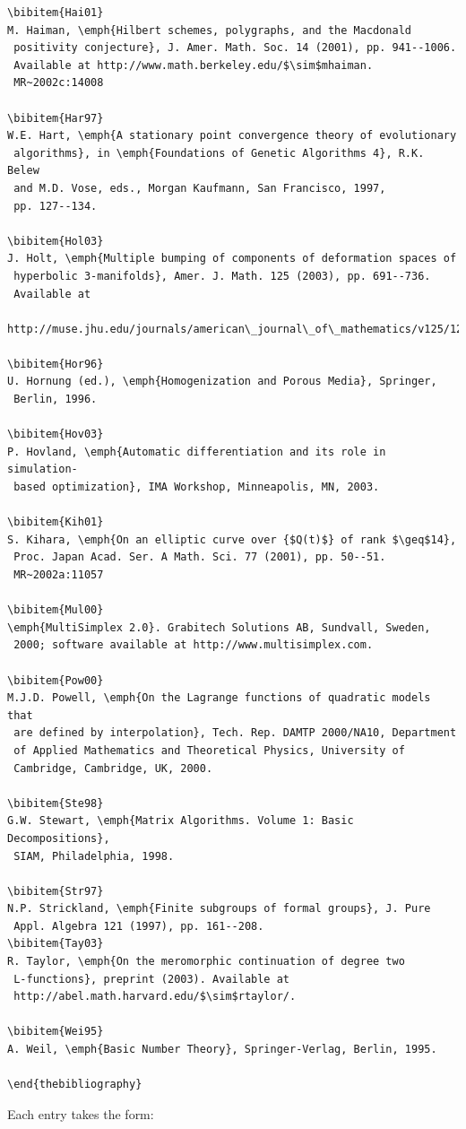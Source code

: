 \documentclass[]{interact}
\theoremstyle{plain}%
\theoremstyle{definition}
\theoremstyle{remark}
\begin{document}
\begin{verbatim}
\bibitem{Hai01}
M. Haiman, \emph{Hilbert schemes, polygraphs, and the Macdonald
 positivity conjecture}, J. Amer. Math. Soc. 14 (2001), pp. 941--1006.
 Available at http://www.math.berkeley.edu/$\sim$mhaiman.
 MR~2002c:14008

\bibitem{Har97}
W.E. Hart, \emph{A stationary point convergence theory of evolutionary
 algorithms}, in \emph{Foundations of Genetic Algorithms 4}, R.K. Belew
 and M.D. Vose, eds., Morgan Kaufmann, San Francisco, 1997,
 pp. 127--134.

\bibitem{Hol03}
J. Holt, \emph{Multiple bumping of components of deformation spaces of
 hyperbolic 3-manifolds}, Amer. J. Math. 125 (2003), pp. 691--736.
 Available at
 http://muse.jhu.edu/journals/american\_journal\_of\_mathematics/v125/125.4holt.pdf.

\bibitem{Hor96}
U. Hornung (ed.), \emph{Homogenization and Porous Media}, Springer,
 Berlin, 1996.

\bibitem{Hov03}
P. Hovland, \emph{Automatic differentiation and its role in simulation-
 based optimization}, IMA Workshop, Minneapolis, MN, 2003.

\bibitem{Kih01}
S. Kihara, \emph{On an elliptic curve over {$Q(t)$} of rank $\geq$14},
 Proc. Japan Acad. Ser. A Math. Sci. 77 (2001), pp. 50--51.
 MR~2002a:11057

\bibitem{Mul00}
\emph{MultiSimplex 2.0}. Grabitech Solutions AB, Sundvall, Sweden,
 2000; software available at http://www.multisimplex.com.

\bibitem{Pow00}
M.J.D. Powell, \emph{On the Lagrange functions of quadratic models that
 are defined by interpolation}, Tech. Rep. DAMTP 2000/NA10, Department
 of Applied Mathematics and Theoretical Physics, University of
 Cambridge, Cambridge, UK, 2000.

\bibitem{Ste98}
G.W. Stewart, \emph{Matrix Algorithms. Volume 1: Basic Decompositions},
 SIAM, Philadelphia, 1998.

\bibitem{Str97}
N.P. Strickland, \emph{Finite subgroups of formal groups}, J. Pure
 Appl. Algebra 121 (1997), pp. 161--208.
\bibitem{Tay03}
R. Taylor, \emph{On the meromorphic continuation of degree two
 L-functions}, preprint (2003). Available at
 http://abel.math.harvard.edu/$\sim$rtaylor/.

\bibitem{Wei95}
A. Weil, \emph{Basic Number Theory}, Springer-Verlag, Berlin, 1995.

\end{thebibliography}
\end{verbatim}
\bigskip
\noindent Each entry takes the form:
\end{document}
